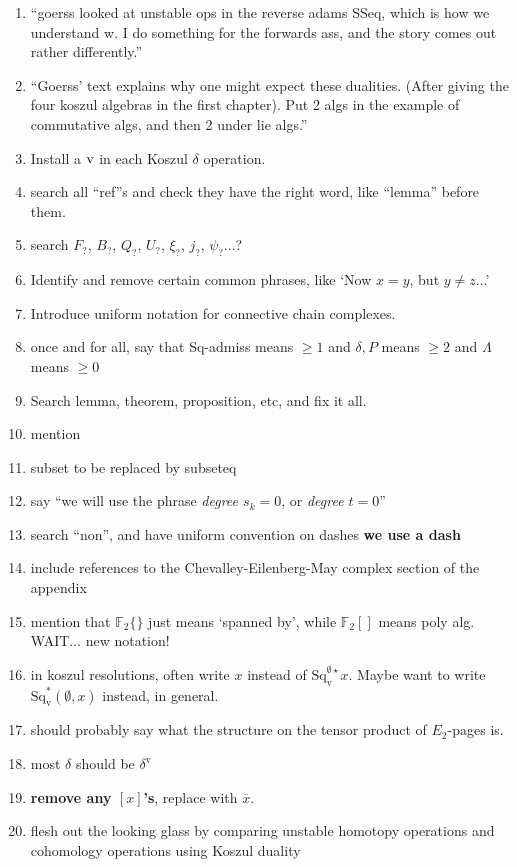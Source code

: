 \documentclass[11pt]{amsart} \renewcommand{\baselinestretch}{1.2}
\theoremstyle{plain}
\theoremstyle{definition}
\newcommand{\F}{\mathbb{F}}
\newcommand{\Ftwo}{\F_2}
\newcommand{\uver}{^\mathrm{v}}
\newcommand{\dver}{_\mathrm{v}}
\newcommand{\Sqv}{\mathrm{Sq}\dver}
\newcommand{\Sqvstar}[1]{\mathrm{Sq}\dver^{#1\star}}
\newcommand{\deltav}{\delta\uver}
\begin{document}
\begin{todolist}
\begin{enumerate}
\item ``goerss looked at unstable ops in the reverse adams SSeq, which is how we understand w. I do something for the forwards ass, and the story comes out rather differently.''
\item 
``Goerss' text explains why one might expect these dualities. (After giving the four koszul algebras in the first chapter). Put 2 algs in the example of commutative algs, and then 2 under lie algs.''
\item Install a $\textup{v}$ in each Koszul $\delta$ operation.
\item search all ``ref''s and check they have the right word, like ``lemma'' before them.
\item search $F_?$, $B_?$, $Q_?$, $U_?$, $\xi_?$, $j_?$, $\psi_?$...?
\item Identify and remove certain common phrases, like `Now $x=y$, but $y\neq z$...'
\item Introduce uniform notation for connective chain complexes.
\item once and for all, say that Sq-admiss means $\geq1$ and $\delta,P$ means $\geq2$ and $\Lambda$ means $\geq0$
\item Search lemma, theorem, proposition, etc, and fix it all.
\item mention %
\item subset to be replaced by subseteq
\item say ``we will use the phrase \emph{degree $s_k=0$}, or \emph{degree $t=0$}''
\item search ``non'', and have uniform convention on dashes \textbf{we use a dash}
\item include references to the Chevalley-Eilenberg-May complex section of the appendix
\item mention that $\Ftwo \{\}$ just means `spanned by', while $\Ftwo []$ means poly alg. WAIT... new notation!
\item in koszul resolutions, often write $x$ instead of $\Sqvstar{\emptyset}x$. Maybe want to write $\Sqv^*(\emptyset,x)$ instead, in general.
\item should probably say what the structure  on the tensor product of $E_2$-pages is.
\item most $\delta$ should be $\deltav$
\item  \textbf{remove any $[x]$'s}, replace with $\overline{x}$.
\item flesh out the looking glass by comparing unstable homotopy operations and cohomology operations using Koszul duality

\end{enumerate}
\end{todolist}
\end{document}
